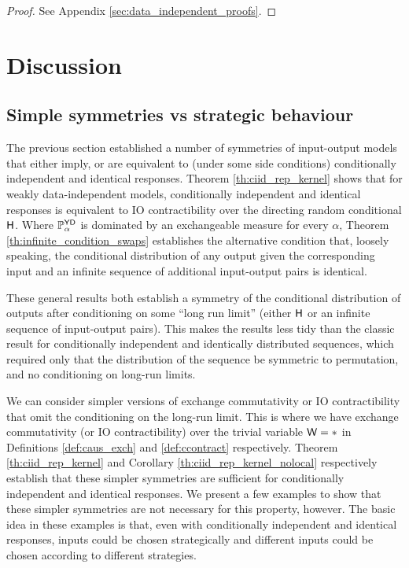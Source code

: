\begin{proof}
See Appendix \ref{sec:data_independent_proofs}.
\end{proof}

\section[Discussion]{Discussion}\label{sec:symmetries_discussion}

\subsection{Simple symmetries vs strategic behaviour}

The previous section established a number of symmetries of input-output models that either imply, or are equivalent to (under some side conditions) conditionally independent and identical responses. Theorem \ref{th:ciid_rep_kernel} shows that for weakly data-independent models, conditionally independent and identical responses is equivalent to IO contractibility over the directing random conditional $\mathsf{H}$. Where $\mathbb{P}_\alpha^{\mathsf{YD}}$ is dominated by an exchangeable measure for every $\alpha$, Theorem \ref{th:infinite_condition_swaps} establishes the alternative condition that, loosely speaking, the conditional distribution of any output given the corresponding input and an infinite sequence of additional input-output pairs is identical.

These general results both establish a symmetry of the conditional distribution of outputs after conditioning on some ``long run limit'' (either $\mathsf{H}$ or an infinite sequence of input-output pairs). This makes the results less tidy than the classic result for conditionally independent and identically distributed sequences, which required only that the distribution of the sequence be symmetric to permutation, and no conditioning on long-run limits.

We can consider simpler versions of exchange commutativity or IO contractibility that omit the conditioning on the long-run limit. This is where we have exchange commutativity (or IO contractibility) over the trivial variable $\mathsf{W}=*$ in Definitions \ref{def:caus_exch} and \ref{def:ccontract} respectively. Theorem \ref{th:ciid_rep_kernel} and Corollary \ref{th:ciid_rep_kernel_nolocal} respectively establish that these simpler symmetries are sufficient for conditionally independent and identical responses. We present a few examples to show that these simpler symmetries are not necessary for this property, however. The basic idea in these examples is that, even with conditionally independent and identical responses, inputs could be chosen strategically and different inputs could be chosen according to different strategies.

